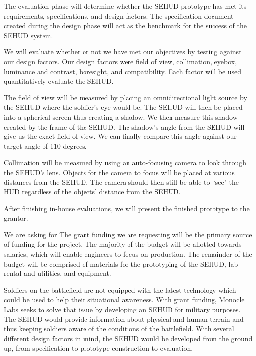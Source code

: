 The evaluation phase will determine whether the SEHUD prototype has met its
requirements, specifications, and design factors. The specification document
created during the design phase will act as the benchmark for the success of
the SEHUD system.



We will evaluate whether or not we have met our objectives by testing against
our design factors. Our design factors were field of view, collimation, eyebox,
luminance and contrast, boresight, and compatibility. Each factor will be used
quantitatively evaluate the SEHUD.


The field of view will be measured by placing an omnidirectional light source
by the SEHUD where the soldier's eye would be. The SEHUD will then be placed
into a spherical screen thus creating a shadow. We then measure this shadow
created by the frame of the SEHUD. The shadow's angle from the SEHUD will give
us the exact field of view. We can finally compare this angle against our
target angle of 110 degrees.

Collimation will be measured by using an auto-focusing camera to look through
the SEHUD's lens. Objects for the camera to focus will be placed at various
distances from the SEHUD. The camera should then still be able to ``see" the
HUD regardless of the objects' distance from the SEHUD.


After finishing in-house evaluations, we will present the finished prototype to
the grantor.



We are asking for
The grant funding we are requesting will be the primary source of funding for
the project. The majority of the budget will be allotted towards salaries,
which will enable engineers to focus on production. The remainder of the
budget will be comprised of materials for the prototyping of the SEHUD, lab
rental and utilities, and equipment.





Soldiers on the battlefield are not equipped with the latest technology which
could be used to help their situational awareness. With grant funding, Monocle
Labs seeks to solve that issue by developing an SEHUD for military purposes.
The SEHUD would provide information about physical and human terrain and thus
keeping soldiers aware of the conditions of the battlefield. With several
different design factors in mind, the SEHUD would be developed from the ground
up, from specification to prototype construction to evaluation.



